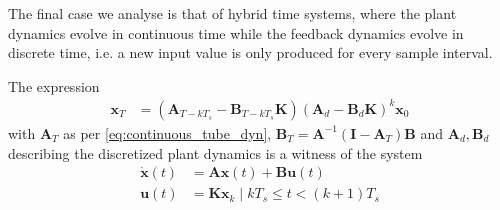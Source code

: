 \documentclass[sigconf]{llncs}
\newcommand{\mat}[1]{\boldsymbol{#1}}
\renewcommand{\vec}[1]{\boldsymbol{#1}}
\begin{document}
The final case we analyse is that of hybrid time systems, where the
plant dynamics evolve in continuous time while the feedback dynamics evolve
in discrete time, i.e. a new input value is only produced for every sample interval.

\begin{theorem}
The expression
 \begin{align}
 \vec{x}_{T} &= (\mat{A}_{T-kT_s}-\mat{B}_{T-kT_s}\mat{K}) (\mat{A}_d-\mat{B}_d\mat{K})^k\vec{x}_0
 \label{eq:cyber_feedback}
 \end{align}
 with $\mat{A}_T$ as per \eqref{eq:continuous_tube_dyn}, 
 $\mat{B}_T=\mat{A}^{-1}(\mat{I}-\mat{A}_T)\mat{B}$ and 
 $\mat{A}_d, \mat{B}_d$ describing the discretized plant dynamics is a witness of the system
 \begin{align}
 \dot{\vec{x}}(t) &= \mat{A}\vec{x}(t)+\mat{B}\vec{u}(t)\nonumber\\
 \vec{u}(t)&=\mat{K}\vec{x}_k  \mid  kT_s \leq t < (k+1)T_s
 \end{align}
 \end{theorem}
%
%
\end{document}
